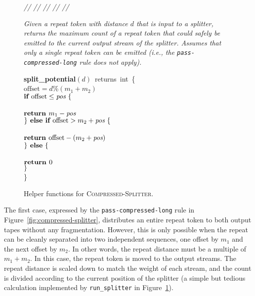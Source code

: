 \begin{figure}[t]
\begin{minipage}{0.1in}
\vspace{-1.75pt}
{\it // // // // //}
\end{minipage}
\begin{minipage}{3.23in}
{\it Given a repeat token with distance $d$ that is input to a
  splitter, returns the maximum count of a repeat token that could
  safely be emitted to the current output stream of the splitter.
  Assumes that only a single repeat token can be emitted (i.e., the
  {\tt pass-compressed-long} rule does not apply).}
\end{minipage}
\mbox{\bf split\_potential}$(d)$~returns~int~\{\\
\tab$\mbox{offset} = d$\%$(m_1 + m_2)$\\
\tab$\mbox{{\bf if~}} \mbox{offset} \leq \mbox{\it pos} ~\{$\\
\tab{}\\
\tab\tab$\mbox{\bf return~} m_1 - \mbox{\it pos}$\\
\tab$\} \mbox{\bf ~else if~} \mbox{offset} > m_2 + \mbox{\it pos} ~\{$\\
\tab{}\\
\tab\tab$\mbox{\bf return~} \mbox{offset} - (m_2 + \mbox{\it pos})$\\
\tab$\} \mbox{\bf ~else} ~\{$\\
\tab{}\\
\tab\tab$\mbox{\bf return~} 0$\\
\tab$\}$\\
\}
\caption{Helper functions for \textsc{Compressed-Splitter}.
\protect\label{fig:helper-splitter}}
\end{figure}

The first case, expressed by the {\tt pass-compressed-long} rule in
Figure~\ref{fig:compressed-splitter}, distributes an entire repeat
token to both output tapes without any fragmentation.  However, this
is only possible when the repeat can be cleanly separated into two
independent sequences, one offset by $m_1$ and the next offset by
$m_2$.  In other words, the repeat distance must be a multiple of
$m_1+m_2$.  In this case, the repeat token is moved to the output
streams.  The repeat distance is scaled down to match the weight of
each stream, and the count is divided according to the current
position of the splitter (a simple but tedious calculation implemented
by {\tt run\_splitter} in Figure~\ref{fig:helper-splitter}).

